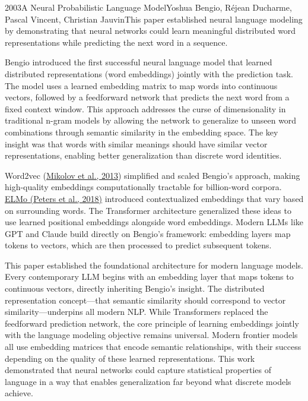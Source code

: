 
\begin{papersummary}{2003}{A Neural Probabilistic Language Model}{Yoshua Bengio, R\'ejean Ducharme, Pascal Vincent, Christian Jauvin}{This paper established neural language modeling by demonstrating that neural networks could learn meaningful distributed word representations while predicting the next word in a sequence.}

Bengio introduced the first successful neural language model that learned distributed representations (word embeddings) jointly with the prediction task. The model uses a learned embedding matrix to map words into continuous vectors, followed by a feedforward network that predicts the next word from a fixed context window. This approach addresses the curse of dimensionality in traditional n-gram models by allowing the network to generalize to unseen word combinations through semantic similarity in the embedding space. The key insight was that words with similar meanings should have similar vector representations, enabling better generalization than discrete word identities.

Word2vec (\hyperref[paper:mikolov-2013]{Mikolov et al., 2013}) simplified and scaled Bengio's approach, making high-quality embeddings computationally tractable for billion-word corpora. \hyperref[paper:peters-2018]{ELMo (Peters et al., 2018)} introduced contextualized embeddings that vary based on surrounding words. The Transformer architecture generalized these ideas to use learned positional embeddings alongside word embeddings. Modern LLMs like GPT and Claude build directly on Bengio's framework: embedding layers map tokens to vectors, which are then processed to predict subsequent tokens.

This paper established the foundational architecture for modern language models. Every contemporary LLM begins with an embedding layer that maps tokens to continuous vectors, directly inheriting Bengio's insight. The distributed representation concept—that semantic similarity should correspond to vector similarity—underpins all modern NLP. While Transformers replaced the feedforward prediction network, the core principle of learning embeddings jointly with the language modeling objective remains universal. Modern frontier models all use embedding matrices that encode semantic relationships, with their success depending on the quality of these learned representations. This work demonstrated that neural networks could capture statistical properties of language in a way that enables generalization far beyond what discrete models achieve.

\end{papersummary}
